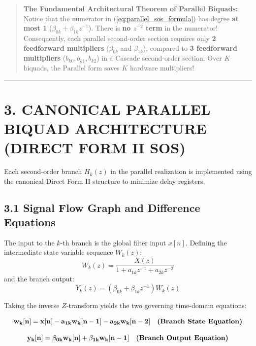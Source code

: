 \documentclass[11pt,a4paper]{article}
\begin{document}
\begin{quote}
\textbf{The Fundamental Architectural Theorem of Parallel Biquads:}
Notice that the numerator in (\ref{eq:parallel_sos_formula}) has degree \textbf{at most 1} ($\beta_{0k} + \beta_{1k} z^{-1}$). There is \textbf{no $z^{-2}$ term} in the numerator!
Consequently, each parallel second-order section requires only \textbf{2 feedforward multipliers} ($\beta_{0k}$ and $\beta_{1k}$), compared to \textbf{3 feedforward multipliers} ($b_{k0}, b_{k1}, b_{k2}$) in a Cascade second-order section. Over $K$ biquads, the Parallel form saves $K$ hardware multipliers!
\end{quote}

\noindent\rule{\textwidth}{0.5pt}

\section{3. CANONICAL PARALLEL BIQUAD ARCHITECTURE (DIRECT FORM II SOS)}

Each second-order branch $H_k(z)$ in the parallel realization is implemented using the canonical Direct Form II structure to minimize delay registers.

\subsection{3.1 Signal Flow Graph and Difference Equations}
The input to the $k$-th branch is the global filter input $x[n]$. Defining the intermediate state variable sequence $W_k(z)$:
\begin{equation}
W_k(z) = \frac{X(z)}{1 + a_{1k} z^{-1} + a_{2k} z^{-2}}
\end{equation}
and the branch output:
\begin{equation}
Y_k(z) = (\beta_{0k} + \beta_{1k} z^{-1}) W_k(z)
\end{equation}

Taking the inverse $Z$-transform yields the two governing time-domain equations:

\begin{equation}
\mathbf{w_k[n] = x[n] - a_{1k} w_k[n-1] - a_{2k} w_k[n-2]} \quad \text{\textbf{(Branch State Equation)}}
\label{eq:parallel_state_eq}
\end{equation}

\begin{equation}
\mathbf{y_k[n] = \beta_{0k} w_k[n] + \beta_{1k} w_k[n-1]} \quad \text{\textbf{(Branch Output Equation)}}
\label{eq:parallel_output_eq}
\end{equation}
\end{document}

